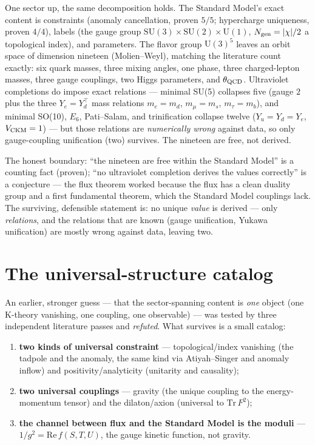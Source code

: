 \documentclass[11pt]{article}
\begin{document}
One sector up, the same decomposition holds. The Standard Model's exact content is constraints
(anomaly cancellation, proven $5/5$; hypercharge uniqueness, proven $4/4$), labels (the gauge
group $\mathrm{SU}(3)\times\mathrm{SU}(2)\times\mathrm{U}(1)$, $N_{\rm gen}=|\chi|/2$ a topological
index), and parameters. The flavor group $\mathrm{U}(3)^5$ leaves an orbit space of dimension
nineteen (Molien--Weyl), matching the literature count exactly: six quark masses, three mixing
angles, one phase, three charged-lepton masses, three gauge couplings, two Higgs parameters, and
$\theta_{\rm QCD}$. Ultraviolet completions do impose exact relations --- minimal SU(5)
collapses five (gauge $2$ plus the three $Y_e=Y_d^{\top}$ mass relations $m_e=m_d$, $m_\mu=m_s$,
$m_\tau=m_b$), and minimal SO(10), $E_6$, Pati--Salam, and trinification collapse twelve
($Y_u=Y_d=Y_e$, $V_{\rm CKM}=1$) --- but those relations are \emph{numerically wrong} against
data, so only gauge-coupling unification (two) survives. The nineteen are free, not derived.

The honest boundary: ``the nineteen are free within the Standard Model'' is a counting fact
(proven); ``no ultraviolet completion derives the values correctly'' is a conjecture --- the
flux theorem worked because the flux has a clean duality group and a first fundamental theorem,
which the Standard Model couplings lack. The surviving, defensible statement is: no unique
\emph{value} is derived --- only \emph{relations}, and the relations that are known (gauge
unification, Yukawa unification) are mostly wrong against data, leaving two.

\section{The universal-structure catalog}

An earlier, stronger guess --- that the sector-spanning content is \emph{one} object (one
K-theory vanishing, one coupling, one observable) --- was tested by three independent literature
passes and \emph{refuted}. What survives is a small catalog:

\begin{enumerate}
\item \textbf{two kinds of universal constraint} --- topological/index vanishing (the tadpole and
the anomaly, the same kind via Atiyah--Singer and anomaly inflow) and positivity/analyticity
(unitarity and causality);
\item \textbf{two universal couplings} --- gravity (the unique coupling to the energy-momentum
tensor) and the dilaton/axion (universal to $\mathrm{Tr}\,F^2$);
\item \textbf{the channel between flux and the Standard Model is the moduli} ---
$1/g^2=\mathrm{Re}\,f(S,T,U)$, the gauge kinetic function, not gravity.
\end{enumerate}
\end{document}
